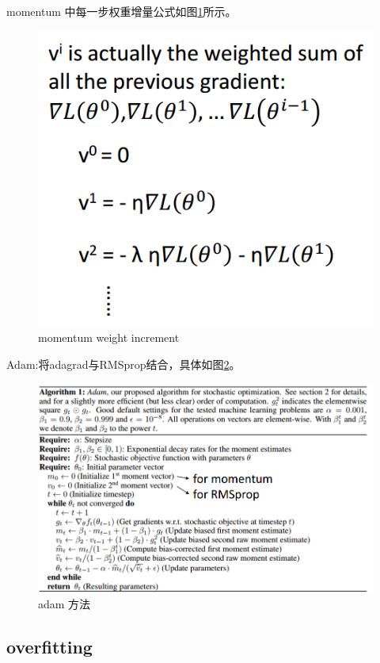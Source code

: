 momentum 中每一步权重增量公式如图\ref{fig:momentum_weight}所示。
\begin{figure}[htb]
	\centering
	\includegraphics[scale=0.4]{pic/momentum_weight}
	\caption{momentum weight increment}
	\label{fig:momentum_weight}
\end{figure}

Adam:将adagrad与RMSprop结合，具体如图\ref{fig:adam}。

\begin{figure}[htb]
	\centering
	\includegraphics[scale=0.6]{pic/adam}
	\caption{adam 方法}
	\label{fig:adam}
\end{figure}

\subsection{overfitting}

